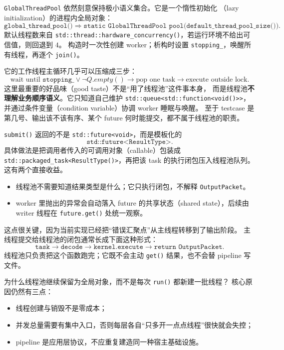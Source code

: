 \texttt{GlobalThreadPool} 依然刻意保持极小语义集合。它是一个惰性初始化
（lazy initialization）的进程内全局对象：
\[
    \texttt{global\_thread\_pool()}
    \Rightarrow
    \texttt{static GlobalThreadPool pool(default\_thread\_pool\_size())}.
\]
默认线程数来自 \texttt{std::thread::hardware\_concurrency()}，若运行环境不给出可信值，则回退到 $4$。
构造时一次性创建 worker；析构时设置 \texttt{stopping\_}，唤醒所有线程，再逐个 \texttt{join()}。

它的工作线程主循环几乎可以压缩成三步：
\[
    \text{wait until } \texttt{stopping\_}\lor\neg Q.empty()
    \longrightarrow
    \text{pop one task}
    \longrightarrow
    \text{execute outside lock}.
\]
这里最重要的好品味（good taste）不是“用了线程池”这件事本身，
而是线程池\textbf{不理解业务顺序语义}。它只知道自己维护
\texttt{std::queue<std::function<void()>>}，
并通过条件变量（condition variable）协调 worker 睡眠与唤醒。
至于 testcase 是第几号、输出该不该有序、某个 future 何时能提交，都不属于线程池的职责。

\texttt{submit()} 返回的不是
\texttt{std::future<void>}，而是模板化的
\[
    \texttt{std::future<ResultType>}.
\]
具体做法是把调用者传入的可调用对象（callable）包装成
\texttt{std::packaged\_task<ResultType()>}，再把该 task 的执行闭包压入线程池队列。
这有两个直接收益。

\begin{itemize}
    \item 线程池不需要知道结果类型是什么；它只执行闭包，不解释 \texttt{OutputPacket}。
    \item worker 里抛出的异常会自动落入 future 的共享状态（shared state），后续由 writer 线程在
          \texttt{future.get()} 处统一观察。
\end{itemize}

这点很关键，因为当前实现已经把“错误汇聚点”从主线程转移到了输出阶段。
主线程提交给线程池的闭包通常长成下面这种形式：
\[
    \texttt{task}
    \longrightarrow
    \texttt{decode}
    \longrightarrow
    \texttt{kernel.execute}
    \longrightarrow
    \texttt{return OutputPacket}.
\]
线程池只负责把这个函数跑完；它既不会主动 \texttt{get()} 结果，也不会替 pipeline 写文件。

为什么线程池继续保留为全局对象，而不是每次 \texttt{run()} 都新建一批线程？
核心原因仍然有三点：

\begin{itemize}
    \item 线程创建与销毁不是零成本；
    \item 并发总量需要有集中入口，否则每层各自“只多开一点点线程”很快就会失控；
    \item pipeline 是应用层协议，不应重复建造同一种宿主基础设施。
\end{itemize}

